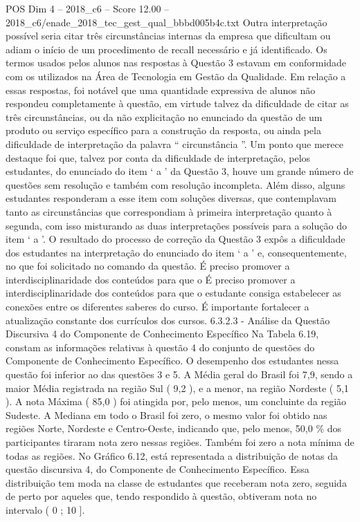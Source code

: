 \begin{textsample}{POS Dim 4 – 2018\_c6 – Score 12.00 – 2018\_c6/enade\_2018\_tec\_gest\_qual\_bbbd005b4c.txt}
Outra interpretação possível seria citar três circunstâncias internas da empresa que dificultam ou adiam o início de um procedimento de recall necessário e já identificado.
Os termos usados pelos alunos nas respostas à Questão 3 estavam em conformidade com os utilizados na Área de Tecnologia em Gestão da Qualidade.
Em relação a essas respostas, foi notável que uma quantidade expressiva de alunos não respondeu completamente à questão, em virtude talvez da dificuldade de citar as três circunstâncias, ou da não explicitação no enunciado da questão de um produto ou serviço específico para a construção da resposta, ou ainda pela dificuldade de interpretação da palavra “ circunstância ”.
Um ponto que merece destaque foi que, talvez por conta da dificuldade de interpretação, pelos estudantes, do enunciado do item ‘ a ’ da Questão 3, houve um grande número de questões sem resolução e também com resolução incompleta.
Além disso, alguns estudantes responderam a esse item com soluções diversas, que contemplavam tanto as circunstâncias que correspondiam à primeira interpretação quanto à segunda, com isso misturando as duas interpretações possíveis para a solução do item ‘ a ’.
O resultado do processo de correção da Questão 3 expôs a dificuldade dos estudantes na interpretação do enunciado do item ‘ a ’ e, consequentemente, no que foi solicitado no comando da questão.
É preciso promover a interdisciplinaridade dos conteúdos para que o É preciso promover a interdisciplinaridade dos conteúdos para que o estudante consiga estabelecer as conexões entre os diferentes saberes do curso.
É importante fortalecer a atualização constante dos currículos dos cursos. 6.3.2.3 - Análise da Questão Discursiva 4 do Componente de Conhecimento Específico Na Tabela 6.19, constam as informações relativas à questão 4 do conjunto de questões do Componente de Conhecimento Específico.
O desempenho dos estudantes nessa questão foi inferior ao das questões 3 e 5.
A Média geral do Brasil foi 7,9, sendo a maior Média registrada na região Sul ( 9,2 ), e a menor, na região Nordeste ( 5,1 ).
A nota Máxima ( 85,0 ) foi atingida por, pelo menos, um concluinte da região Sudeste.
A Mediana em todo o Brasil foi zero, o mesmo valor foi obtido nas regiões Norte, Nordeste e Centro-Oeste, indicando que, pelo menos, 50,0 \% dos participantes tiraram nota zero nessas regiões.
Também foi zero a nota mínima de todas as regiões.
No Gráfico 6.12, está representada a distribuição de notas da questão discursiva 4, do Componente de Conhecimento Específico.
Essa distribuição tem moda na classe de estudantes que receberam nota zero, seguida de perto por aqueles que, tendo respondido à questão, obtiveram nota no intervalo ( 0 ; 10 ].

\end{textsample}
